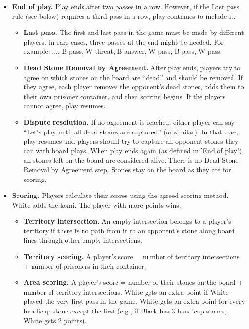 \documentclass[11pt]{article}
\begin{document}
\begin{itemize}
\item \textbf{End of play.} Play ends after two passes in a row.
However, if the Last pass rule (see below) requires a third pass in a row, play continues to include it.
    \begin{itemize}
    \item \textbf{Last pass.} The first and last pass in the game must be made by different players.
    In rare cases, three passes at the end might be needed. For example: ..., B pass, W threat, B answer, W pass, B pass, W pass.
    \item \textbf{Dead Stone Removal by Agreement.} After play ends, players try to agree on which stones on the board are ``dead'' and should be removed.
    If they agree, each player removes the opponent's dead stones, adds them to their own prisoner container, and then scoring begins.
    If the players cannot agree, play resumes.
    \item \textbf{Dispute resolution.} If no agreement is reached, either player can say ``Let's play until all dead stones are captured'' (or similar).
    In that case, play resumes and players should try to capture all opponent stones they can with board plays.
    When play ends again (as defined in 'End of play'), all stones left on the board are considered alive.
    There is no Dead Stone Removal by Agreement step.
    Stones stay on the board as they are for scoring.
    \end{itemize}

\item \textbf{Scoring.} Players calculate their scores using the agreed scoring method.
White adds the komi.
The player with more points wins.
    \begin{itemize}
    \item \textbf{Territory intersection.} An empty intersection belongs to a player's territory if there is no path from it to an opponent's stone along board lines through other empty intersections.
    \item \textbf{Territory scoring.} A player's score = number of territory intersections + number of prisoners in their container.
    \item \textbf{Area scoring.} A player's score = number of their stones on the board + number of territory intersections.
    White gets an extra point if White played the very first pass in the game.
    White gets an extra point for every handicap stone except the first (e.g., if Black has 3 handicap stones, White gets 2 points).
    \end{itemize}
\end{itemize}
\end{document}
